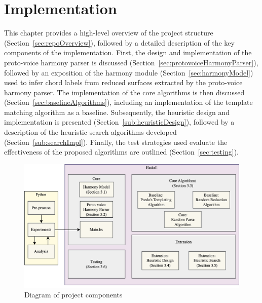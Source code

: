 \documentclass[12pt,a4paper,twoside,openany]{report} \usepackage[pdfborder={0 0 0}]{hyperref}    %
\theoremstyle{definition} \newtheorem{definition}{Definition}[section]
\begin{document}

    \chapter{Implementation}
    \label{chap:implementation}
    This chapter provides a high-level overview of the project structure (Section~\ref{sec:repoOverview}),
    followed by a detailed description of the key components of the implementation. 
    First, the design and implementation of the proto-voice harmony parser is discussed 
    (Section~\ref{sec:protovoiceHarmonyParser}), followed by an exposition of the harmony module
    (Section~\ref{sec:harmonyModel}) used to infer chord labels from reduced surfaces extracted by the proto-voice
    harmony parser. The implementation of the core algorithms is then discussed (Section~\ref{sec:baselineAlgorithms}), 
    including an implementation of the template matching algorithm \cite{pardoAlgorithmsChordalAnalysis2002} as a baseline. 
    Subsequently, the heuristic design and implementation is presented (Section~\ref{sub:heuristicDesign}), followed by 
    a description of the heuristic search algorithms developed (Section~\ref{sub:searchImpl}). 
    Finally, the test strategies used evaluate the effectiveness of the proposed algorithms are outlined (Section~\ref{sec:testing}).

    \begin{figure}[ht] 
    \centering 
    \includegraphics[width=\textwidth]{figs/impl/blockDiag/DissBlockDiagram.png} 
    \caption{Diagram of project components} 
    \label{fig:blockDiagram} 
    \end{figure}
\end{document}
